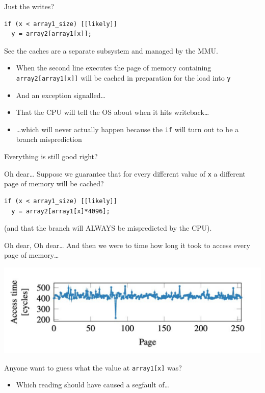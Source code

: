 \documentclass[9pt,aspectratio=169]{beamer}
\begin{document}
\begin{frame}[label={sec:org97decb4},fragile]{Just the writes?}
 \begin{verbatim}
if (x < array1_size) [[likely]]
  y = array2[array1[x]];
\end{verbatim}

See the caches are a separate subsystem and managed by the MMU.
\begin{itemize}
\item When the second line executes the page of memory containing \texttt{array2[array1[x]]} will be cached in preparation for the load into \texttt{y}
\item And an exception signalled\ldots{}
\item That the CPU will tell the OS about when it hits writeback\ldots{}
\item \ldots{}which will never actually happen because the \texttt{if} will turn out to be a branch misprediction
\end{itemize}

\begin{block}{Everything is still good right?}
\end{block}
\end{frame}

\begin{frame}[label={sec:org98aaa60},fragile]{Oh dear\ldots{}}
 Suppose we guarantee that for every different value of \texttt{x} a different page of memory will be cached?

\begin{verbatim}
if (x < array1_size) [[likely]]
  y = array2[array1[x]*4096];
\end{verbatim}

(and that the branch will ALWAYS be mispredicted by the CPU).
\end{frame}

\begin{frame}[label={sec:orge60d62e},fragile]{Oh dear, Oh dear\ldots{}}
 And then we were to time how long it took to access every page of memory\ldots{}

\begin{center}
\includegraphics[width=.9\linewidth]{./pagetimes.png}
\end{center}

Anyone want to guess what the value at \texttt{array1[x]} was?
\begin{itemize}
\item Which reading should have caused a segfault of\ldots{}
\end{itemize}
\end{frame}
\end{document}
